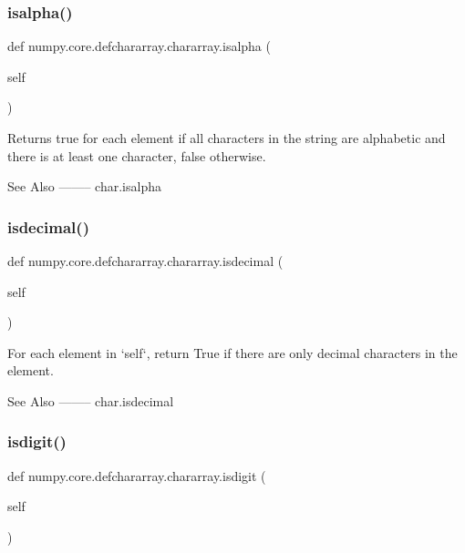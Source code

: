 \subsubsection{\texorpdfstring{isalpha()}{isalpha()}}
{\footnotesize\ttfamily def numpy.\+core.\+defchararray.\+chararray.\+isalpha (\begin{DoxyParamCaption}\item[{}]{self }\end{DoxyParamCaption})}

\begin{DoxyVerb}Returns true for each element if all characters in the string
are alphabetic and there is at least one character, false
otherwise.

See Also
--------
char.isalpha\end{DoxyVerb}
 \mbox{\label{classnumpy_1_1core_1_1defchararray_1_1chararray_a43a6a667de99eb67549f8c126d3680f7}} 
\subsubsection{\texorpdfstring{isdecimal()}{isdecimal()}}
{\footnotesize\ttfamily def numpy.\+core.\+defchararray.\+chararray.\+isdecimal (\begin{DoxyParamCaption}\item[{}]{self }\end{DoxyParamCaption})}

\begin{DoxyVerb}For each element in `self`, return True if there are only
decimal characters in the element.

See Also
--------
char.isdecimal\end{DoxyVerb}
 \mbox{\label{classnumpy_1_1core_1_1defchararray_1_1chararray_afb2a4694929d8dfc4ce3b6e2ac2e0880}} 
\subsubsection{\texorpdfstring{isdigit()}{isdigit()}}
{\footnotesize\ttfamily def numpy.\+core.\+defchararray.\+chararray.\+isdigit (\begin{DoxyParamCaption}\item[{}]{self }\end{DoxyParamCaption})}

